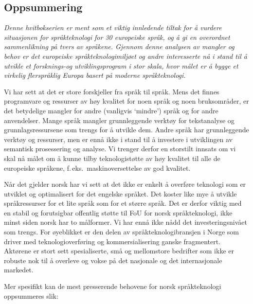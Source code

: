 \begin{multicols}{2}
\subsection{Oppsummering}

\emph{Denne hvitbokserien er ment som et viktig innledende tiltak for å vurdere situasjonen for språkteknologi for 30 europeiske språk, og å gi en overordnet sammenlikning på tvers av språkene. Gjennom denne analysen av mangler og behov er det europeiske språkteknologimiljøet og andre interesserte nå i stand til å utvikle et forsknings-og utviklingsprogram i stor skala, hvor målet er å bygge et virkelig flerspråklig Europa basert på moderne språkteknologi.}

Vi har sett at det er store forskjeller fra språk til språk. Mens det finnes programvare og ressurser av høy kvalitet for noen språk og noen bruksområder, er det betydelige mangler for andre (vanligvis `mindre') språk og for andre anvendelser. Mange språk mangler grunnleggende verktøy for tekstanalyse og grunnlagsressursene som trengs for å utvikle dem. Andre språk har grunnleggende verktøy og ressurser, men er ennå ikke i stand til å investere i utviklingen av semantisk prosessering og analyse. Vi trenger derfor en storstilt innsats om vi skal nå målet om å kunne tilby teknologistøtte av høy kvalitet til alle de europeiske språkene, f.\,eks.~maskinoversettelse av god kvalitet.

Når det gjelder norsk har vi sett at det ikke er enkelt å overføre teknologi som er utviklet og optimalisert for det engelske språket. 
Det koster like mye å utvikle språkressurser for et lite språk som for et større språk. Det er derfor viktig med en stabil og forutsigbar offentlig støtte til FoU for norsk språkteknologi, ikke minst siden norsk har to målformer. 
Vi har ennå ikke nådd det investeringsnivået som trengs. For øyeblikket er den delen av språkteknologibransjen i Norge som driver med teknologioverføring og kommersialisering ganske fragmentert. Aktørene er stort sett spesialiserte, små og mellomstore bedrifter som ikke er robuste nok til å overleve og vokse på det nasjonale og det internasjonale markedet.

Mer spesifikt kan de mest presserende behovene for norsk
språkteknologi oppsummeres slik:


\end{multicols}
